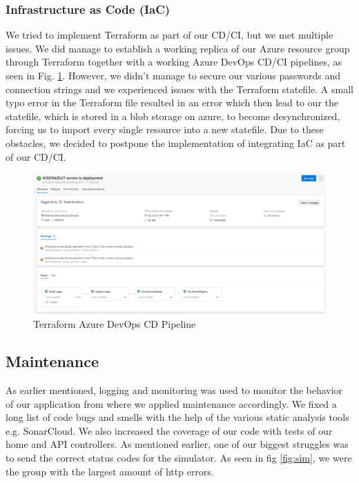 \documentclass{article}
\begin{document}
    \subsubsection{Infrastructure as Code (IaC)}
    We tried to implement Terraform as part of our CD/CI, but we met multiple issues. We did manage to establish a working replica of our Azure resource group through Terraform together with a working Azure DevOps CD/CI pipelines, as seen in Fig. \ref{fig:terr}. However, we didn't manage to secure our various passwords and connection strings and we experienced issues with the Terraform statefile. A small typo error in the Terraform file resulted in an error which then lead to our the statefile, which is stored in a blob storage on azure, to become desynchronized, forcing us to import every single resource into a new statefile. Due to these obstacles, we decided to postpone the implementation of integrating IaC as part of our CD/CI. 
    \begin{figure}[H]
    \centering
    \includegraphics[width=1\textwidth]{images/terrCDCI.png}
    \caption{\label{fig:terr} Terraform Azure DevOps CD Pipeline}
    \end{figure}
        

\subsection{Maintenance}
As earlier mentioned, logging and monitoring was used to monitor the behavior of our application from where we applied maintenance accordingly. We fixed a long list of code bugs and smells with the help of the various static analysis tools e.g. SonarCloud. We also increased the coverage of our code with tests of our home and API controllers.  
As mentioned earlier, one of our biggest struggles was to send the correct status codes for the simulator. As seen in fig \ref{fig:sim}, we were the group with the largest amount of http errors. 
\end{document}

